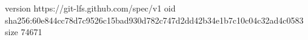 version https://git-lfs.github.com/spec/v1
oid sha256:60e844cc78d7c9526c15bad930d782c747d2dd42b34e1b7c10c04c32ad4c0583
size 74671
